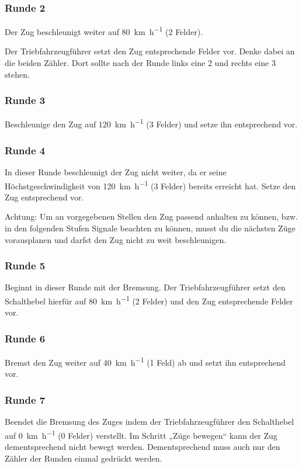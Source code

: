 \subsubsection*{Runde 2}
   Der Zug beschleunigt weiter auf \SI{80}{\kilo\metre\per\hour} (2 Felder).

   Der Triebfahrzeugführer setzt den Zug entsprechende Felder vor. Denke dabei an die beiden Zähler. Dort sollte nach der Runde links eine 2 und rechts eine 3 stehen.

\subsubsection*{Runde 3}
  Beschleunige den Zug auf \SI{120}{\kilo\metre\per\hour} (3 Felder) und setze ihn entsprechend vor.

\subsubsection*{Runde 4}
  In dieser Runde beschleunigt der Zug nicht weiter, da er seine Höchstgeschwindigkeit von \SI{120}{\kilo\metre\per\hour} (3 Felder) bereits erreicht hat. Setze den Zug entsprechend vor.
  \begin{framed}\noindent
    Achtung: Um an vorgegebenen Stellen den Zug passend anhalten zu können, bzw. in den folgenden Stufen Signale beachten zu können, musst du die nächsten Züge vorausplanen und darfst den Zug nicht zu weit beschleunigen.
  \end{framed}

\subsubsection*{Runde 5}
  Beginnt in dieser Runde mit der Bremsung. Der Triebfahrzeugführer setzt den Schalthebel hierfür auf \SI{80}{\kilo\metre\per\hour} (2 Felder) und den Zug entsprechende Felder vor.

\subsubsection*{Runde 6}
  Bremst den Zug weiter auf \SI{40}{\kilo\metre\per\hour} (1 Feld) ab und setzt ihn entsprechend vor.

\subsubsection*{Runde 7}
  Beendet die Bremsung des Zuges indem der Triebfahrzeugführer den Schalthebel auf \SI{0}{\kilo\metre\per\hour} (0 Felder) verstellt. Im Schritt „Züge bewegen“ kann der Zug dementsprechend nicht bewegt werden. Dementsprechend muss auch nur den Zähler der Runden einmal gedrückt werden.

